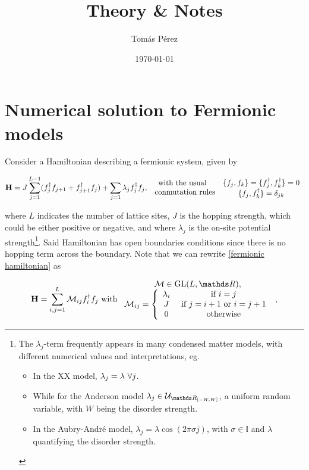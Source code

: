 \documentclass{homework}
\author{Tomás Pérez}
\date{\today}
\title{Theory \& Notes}
\begin{document}
 \maketitle

\section{Numerical solution to Fermionic models}

Consider a Hamiltonian describing a fermionic system, given by 

\begin{equation}
    {\bf H} = J \sum_{j=1}^{L-1} (f_{j}^{\dagger}f_{j+1} + f_{j+1}^{\dagger}f_{j}) + \sum_{j=1} \lambda_j f_{j}^{\dagger} f_j, \begin{array}{c}
         \textnormal{with the usual } \\
         \textnormal{ conmutation rules} 
    \end{array}
    \begin{array}{c}
         \{f_j, f_k\} = \{f_j^\dagger, f_k^\dagger\} = 0  \\
         \{f_j, f_k^\dagger\} = \delta_{jk}
    \end{array}
    \label{fermionic hamiltonian}
\end{equation}

where $L$ indicates the number of lattice sites, $J$ is the hopping strength, which could be either positive or negative, and where $\lambda_j$ is the on-site potential strength\footnote{The $\lambda_j$-term frequently appears in many condensed matter models, with different numerical values and interpretations, eg.

\begin{itemize}
    \item In the XX model, $\lambda_j = \lambda \textnormal{ } \forall j$. 
    \item While for the Anderson model $\lambda_j \in \mathcal{U}_{\R_{[-W, W]}}$, a uniform random variable, with $W$ being the disorder strength. 
    \item In the Aubry-André model, $\lambda_j = \lambda \cos(2\pi\sigma j)$, with $\sigma \in \mathds{I}$ and $\lambda$ quantifying the disorder strength. 
\end{itemize}}. Said Hamiltonian has open boundaries conditions since there is no hopping term across the boundary. Note that we can rewrite \eqref{fermionic hamiltonian} as 

\begin{equation}
    {\bf H} = \sum_{i, j = 1}^{L} \M_{ij} f_i^{\dagger} f_j \textnormal{ with } \begin{array}{c}
         \M \in \textnormal{GL}(L, \R), \\
         \M_{ij} = \left\{\begin{array}{cc}
             \lambda_i & \textnormal{ if } i=j  \\
              J & \textnormal{ if } j=i+1 \textnormal{ or } i = j + 1 \\
              0 & \textnormal{ otherwise}
         \end{array} \right.
    \end{array},
\end{equation}
\end{document}
